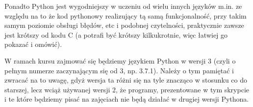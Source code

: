 Ponadto Python jest wygodniejszy w uczeniu od wielu innych języków m.in. ze względu na to że
	kod pythonowy realizujący tą samą funkcjonalność, przy takim samym poziomie obsługi błędów, etc i podobnej czytelności,
	praktycznie zawsze jest krótszy od kodu C (a potrafi być krótszy kilkukrotnie, więc łatwiej go pokazać i omówić).

W ramach kursu zajmować się będziemy językiem Python w wersji 3 (czyli o pełnym numerze zaczynającym się od 3, np. 3.7.1).
Należy o tym pamiętać i zwracać na to uwagę, gdyż wersja ta różni się na tyle znacząco w stosunku co do starszej, lecz wciąż używanej wersji 2,
	że programy, prezentowane w tym skrypcie i te które będziemy pisać na zajęciach nie będą działać w drugiej wersji Pythona.
